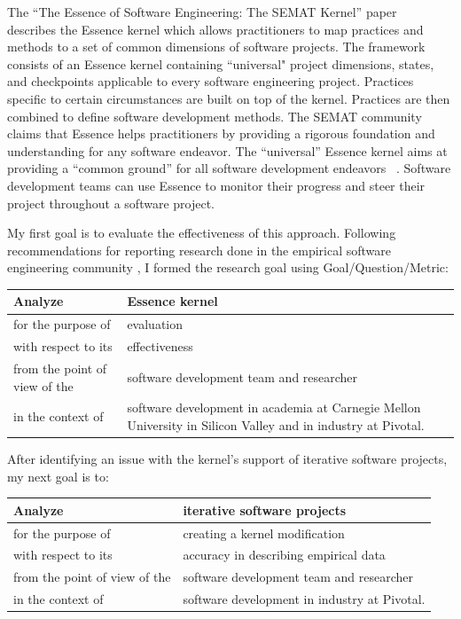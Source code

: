 \documentclass[preprint,12pt,3p]{elsarticle}
\begin{document}
The ``The Essence of Software Engineering: The SEMAT Kernel'' paper ~\cite{JacobsonQueue} describes the Essence kernel which allows practitioners to map practices and methods to a set of common dimensions of software projects. The framework consists of an Essence kernel containing ``universal" project dimensions, states, and checkpoints applicable to every software engineering project. Practices specific to certain circumstances are built on top of the kernel. Practices are then combined to define software development methods. The SEMAT community claims that Essence helps practitioners by providing a rigorous foundation and understanding for any software endeavor. The “universal” Essence kernel aims at providing a “common ground” for all software development endeavors ~\cite{JacobsonQueue}. Software development teams can use Essence to monitor their progress and steer their project throughout a software project. 

My first goal is to evaluate the effectiveness of this approach. Following recommendations for reporting research done in the empirical
software engineering community
\cite{GQM, Shaw}, I formed the
research goal using Goal/Question/Metric:
\cite{GQM}

\begin{table}[H]
\centering
\begin{tabular}{|p{2.00in}|p{4.10in}|}
\hline
Analyze & Essence kernel  \\ \hline
for the purpose of & evaluation \\ \hline
with respect to its & effectiveness \\ \hline
from the point of view of the & software development team and researcher \\ \hline
in the context of & software development in academia at Carnegie Mellon University in Silicon Valley and in industry at Pivotal. \\
\hline
\end{tabular}
\end{table}

After identifying an issue with the kernel's support of iterative software projects, my next goal is to: 

\begin{table}[H]
\centering
\begin{tabular}{|p{2.00in}|p{4.10in}|}
\hline
Analyze & iterative software projects  \\ \hline
for the purpose of & creating a kernel modification  \\ \hline
with respect to its & accuracy in describing empirical data \\ \hline
from the point of view of the & software development team and researcher \\ \hline
in the context of & software development in industry at Pivotal. \\
\hline
\end{tabular}
\end{table}
\end{document}
